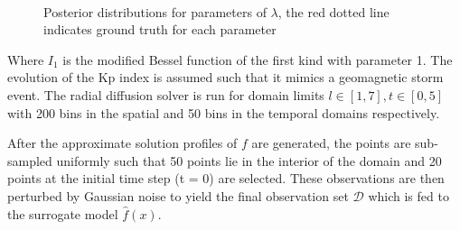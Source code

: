 \documentclass{article}
\begin{document}
\begin{figure}[h]
  \centering
  \mbox{
    \quad
    \quad
  }
  \caption{Posterior distributions for parameters of $\lambda$, the red dotted line indicates ground truth for each parameter}
  \label{fig:postlambda}
\end{figure}


Where $I_1$ is the modified Bessel function of the first kind with parameter 1. 
The evolution of the Kp index \citep{BartelsKp} is assumed such that it mimics a geomagnetic storm event. 
The radial diffusion solver is run for domain limits $l \in [1, 7], t \in [0, 5]$ with
200 bins in the spatial and 50 bins in the temporal domains respectively.

After the approximate solution profiles of $f$ are generated, the points are sub-sampled
uniformly such that 50 points lie in the interior of the domain and 20 points at the initial time step (t = 0)
are selected. These observations are then perturbed by Gaussian noise to yield
the final observation set $\mathcal{D}$ which is fed to the surrogate model $\hat{f}(x)$.
\end{document}
